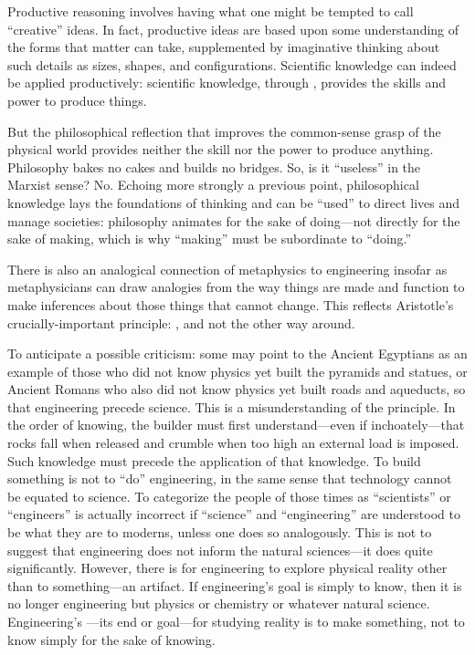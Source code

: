 Productive reasoning involves having what one might be tempted to call ``creative'' ideas. In fact, productive ideas are based upon some understanding of the forms that matter can take, supplemented by imaginative thinking about such details as sizes, shapes, and configurations. Scientific knowledge can indeed be applied productively: scientific knowledge, through , provides the skills and power to produce things.

But the philosophical reflection that improves the common-sense grasp of the physical world provides neither the skill nor the power to produce anything. Philosophy bakes no cakes and builds no bridges. So, is it ``useless'' in the Marxist sense? No. Echoing more strongly a previous point, philosophical knowledge lays the foundations of thinking and can be ``used'' to direct lives and manage societies: philosophy animates for the sake of doing---not directly for the sake of making, which is why ``making'' must be subordinate to ``doing.''

There is also an analogical connection of metaphysics to engineering insofar as metaphysicians can draw analogies from the way things are made and function to make inferences about those things that cannot change. This reflects Aristotle's crucially-important principle: , and not the other way around.

To anticipate a possible criticism: some may point to the Ancient Egyptians as an example of those who did not know physics yet built the pyramids and statues, or Ancient Romans who also did not know physics yet built roads and aqueducts, so that engineering  precede science. This is a misunderstanding of the principle. In the order of knowing, the builder must first understand---even if inchoately---that rocks fall when released and crumble when too high an external load is imposed. Such knowledge must precede the application of that knowledge. To build something is not to ``do'' engineering, in the same sense that technology cannot be equated to science. To categorize the people of those times as ``scientists'' or ``engineers'' is actually incorrect if ``science'' and ``engineering'' are understood to be what they are to moderns, unless one does so analogously. This is not to suggest that engineering does not inform the natural sciences---it does quite significantly. However, there is  for engineering to explore physical reality other than to  something---an artifact. If engineering's goal is simply to know, then it is no longer engineering but physics or chemistry or whatever natural science. Engineering's ---its end or goal---for studying reality is to make something, not to know simply for the sake of knowing.

